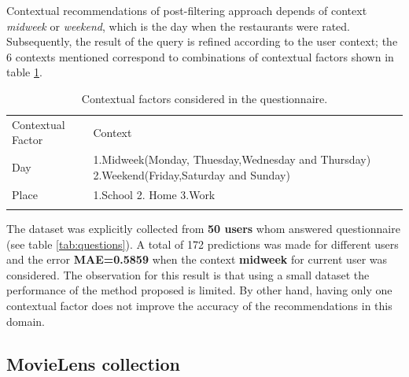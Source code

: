 Contextual recommendations of post-filtering approach depends of
context \textit{midweek} or \textit{weekend}, which is the day when
the restaurants were rated. Subsequently, the result of the query is
refined according to the user context; the 6 contexts mentioned
correspond to combinations of contextual factors shown in table
\ref{tab:contextstijuana}.
\begin{table}
\small
\captionsetup{font=footnotesize}
\caption{Contextual factors considered in the questionnaire.}
\label{tab:contextstijuana} 
\centering
\begin{tabular}{p{2.5cm} p{7cm} }
\hline\noalign{\smallskip}
Contextual Factor & Context \\
\noalign{\smallskip}\hline\noalign{\smallskip}
\small{Day} & \small{1.Midweek(Monday, Thuesday,Wednesday and Thursday) 
2.Weekend(Friday,Saturday and Sunday)}  \\ \hline 
\small{Place} & \small{1.School 2. Home 3.Work} \\ 
\noalign{\smallskip}\hline
\end{tabular}
\end{table}
The dataset was explicitly collected from \textbf{50 users} whom
answered questionnaire (see table \ref{tab:questions}). A total of 172
predictions was made for different users and the error
\textbf{MAE=0.5859} when the context \textbf{midweek} for current user
was considered. The observation for this result is that using a small
dataset the performance of the method proposed is limited. By other
hand, having only one contextual factor does not improve the accuracy
of the recommendations in this domain.

\subsection{MovieLens collection} 

